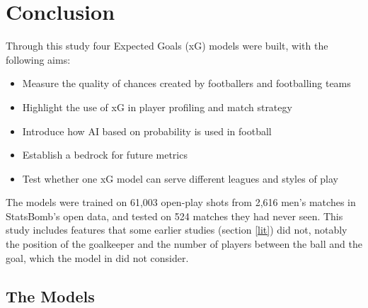 \chapter{Conclusion}

Through this study four Expected Goals (xG) models were built, with the following aims:
\begin{itemize}
    \item Measure the quality of chances created by footballers and footballing teams
    \item Highlight the use of xG in player profiling and match strategy
    \item Introduce how AI based on probability is used in football
    \item Establish a bedrock for future metrics
    \item Test whether one xG model can serve different leagues and styles of play
\end{itemize}

The models were trained on 61,003 open-play shots from 2,616 men's matches in StatsBomb's open data, and tested on 524 matches they had never seen. This study includes features that some earlier studies (section \ref{lit}) did not, notably the position of the goalkeeper and the number of players between the ball and the goal, which the model in \cite{rathke2017examination} did not consider.

\section{The Models}

